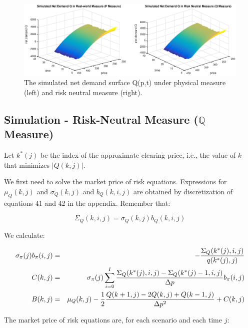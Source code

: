 \documentclass{article}
\begin{document}
\begin{center}
\begin{figure}[tbp]
\centering
\includegraphics[scale = 0.5]{Q_both_measures.eps}\newline
\caption{The simulated net demand surface Q(p,t) under physical measure
(left) and risk neutral measure (right).}
\label{fig::AAPL_20110401_simulated_both_measures}
\end{figure}
\end{center}

\subsection{Simulation - Risk-Neutral Measure ($\mathbb{Q}$ Measure)}

Let $k^{\ast }(j)$ be the index of the approximate clearing price, i.e., the
value of $k$ that minimizes $|Q(k,j)|$.

We first need to solve the market price of risk equations. Expressions for $%
\mu _{Q}(k,j)$ and $\sigma _{Q}(k,j)$ and $b_{Q}(k,i,j)$ are obtained by
discretization of equations 41 and 42 in the appendix. Remember that:

\begin{equation*}
\Sigma _{Q}(k,i,j)=\sigma _{Q}(k,j)b_{Q}(k,i,j)
\end{equation*}

We calculate:

\begin{eqnarray*}
\sigma _{\pi }(j)b_{\pi }(i,j) &=&-\frac{\Sigma _{Q}(k^{\ast }(j),i,j)}{%
q(k^{\ast }(j),j)} \\
C(k,j) &=&\sigma _{\pi }(j)\sum_{i=0}^{I}\frac{\Sigma _{Q}(k^{\ast
}(j),i,j)-\Sigma _{Q}(k^{\ast }(j)-1,i,j)}{\Delta p}b_{\pi }(i,j) \\
B(k,j) &=&\mu _{Q}(k,j)-\frac{1}{2}\frac{Q(k+1,j)-2Q(k,j)+Q(k-1,j)}{\Delta
p^{2}}+C(k,j)
\end{eqnarray*}

The market price of risk equations are, for each scenario and each time $j$:
\end{document}
